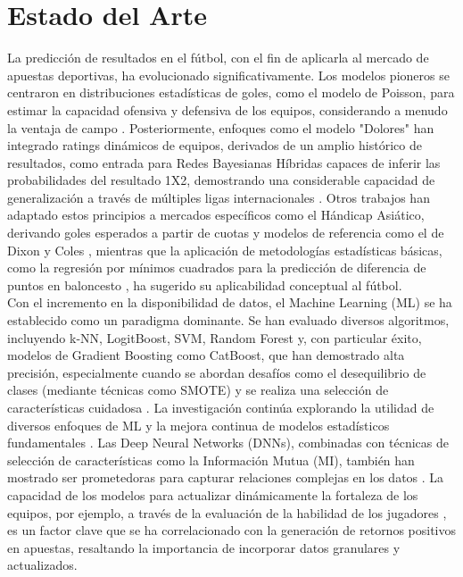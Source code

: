 \section{Estado del Arte}

La predicción de resultados en el fútbol, con el fin de aplicarla al mercado de apuestas deportivas, ha evolucionado significativamente.
Los modelos pioneros se centraron en distribuciones estadísticas de goles, como el modelo de Poisson, para estimar la capacidad ofensiva y defensiva de los equipos, considerando a menudo la ventaja de campo \cite{Fontanella2020Visual}.
Posteriormente, enfoques como el modelo "Dolores" han integrado ratings dinámicos de equipos, derivados de un amplio histórico de resultados, como entrada para Redes Bayesianas Híbridas capaces de inferir las probabilidades del resultado 1X2, demostrando una considerable capacidad de generalización a través de múltiples ligas internacionales \cite{Constantinou2019Dolores}.
Otros trabajos han adaptado estos principios a mercados específicos como el Hándicap Asiático, derivando goles esperados a partir de cuotas y modelos de referencia como el de Dixon y Coles \cite{Chen2019Cluster},
mientras que la aplicación de metodologías estadísticas básicas, como la regresión por mínimos cuadrados para la predicción de diferencia de puntos en baloncesto \cite{Lu2019NBAPointDiff}, ha sugerido su aplicabilidad conceptual al fútbol. \\

Con el incremento en la disponibilidad de datos, el Machine Learning (ML) se ha establecido como un paradigma dominante.
Se han evaluado diversos algoritmos, incluyendo k-NN, LogitBoost, SVM, Random Forest y, con particular éxito, modelos de Gradient Boosting como CatBoost, que han demostrado alta precisión, especialmente cuando se abordan desafíos como el desequilibrio de clases (mediante técnicas como SMOTE) y se realiza una selección de características cuidadosa \cite{Malamatinos2022GreekLeague}.
La investigación continúa explorando la utilidad de diversos enfoques de ML \cite{Jaeyalakshmi2023PredictingOutcomeML} y la mejora continua de modelos estadísticos fundamentales \cite{Loukas2024PoissonRegression}.
Las Deep Neural Networks (DNNs), combinadas con técnicas de selección de características como la Información Mutua (MI), también han mostrado ser prometedoras para capturar relaciones complejas en los datos \cite{Tammouch2024BettingML}.
La capacidad de los modelos para actualizar dinámicamente la fortaleza de los equipos, por ejemplo, a través de la evaluación de la habilidad de los jugadores \cite{holmesForecastingFootballMatch2024}, es un factor clave que se ha correlacionado con la generación de retornos positivos en apuestas, resaltando la importancia de incorporar datos granulares y actualizados. \\

